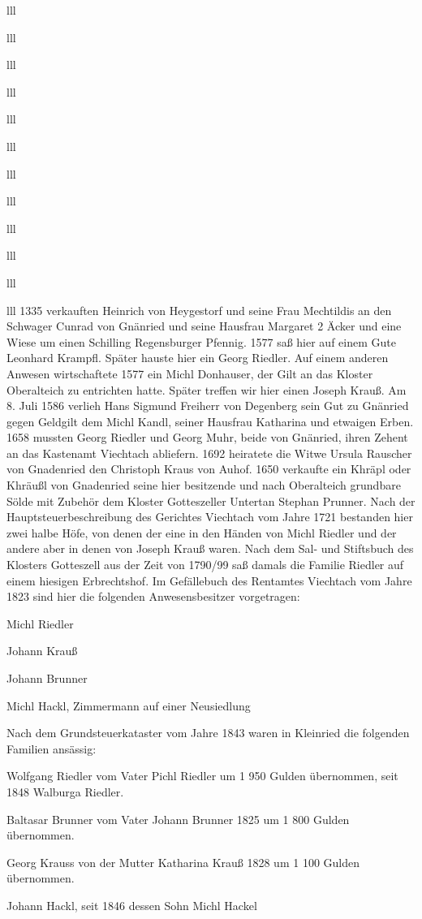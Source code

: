 \documentclass[12pt,a4pager]{book}
\begin{document}
\begin{tabuluar}{lll}
\begin{tabuluar}{lll}
\begin{tabuluar}{lll}
\begin{tabuluar}{lll}
\begin{tabuluar}{lll}
\begin{tabuluar}{lll}
\begin{tabuluar}{lll}
\begin{tabuluar}{lll}
\begin{tabuluar}{lll}
\begin{tabuluar}{lll}
\begin{tabuluar}{lll}
\begin{tabuluar}{lll}
1335 verkauften Heinrich von Heygestorf und seine Frau Mechtildis an den
Schwager Cunrad von Gnänried und seine Hausfrau Margaret 2 Äcker und eine Wiese
um einen Schilling Regensburger Pfennig. 1577 saß hier auf einem Gute Leonhard
Krampfl. Später hauste hier ein Georg Riedler. Auf einem anderen Anwesen
wirtschaftete 1577 ein Michl Donhauser, der Gilt an das Kloster Oberalteich zu
entrichten hatte. Später treffen wir hier einen Joseph Krauß. Am 8. Juli 1586
verlieh Hans Sigmund Freiherr von Degenberg sein Gut zu Gnänried gegen Geldgilt
dem Michl Kandl, seiner Hausfrau Katharina und etwaigen Erben. 1658 mussten
Georg Riedler und Georg Muhr, beide von Gnänried, ihren Zehent an das Kastenamt
Viechtach abliefern. 1692 heiratete die Witwe Ursula Rauscher von Gnadenried den
Christoph Kraus von Auhof. 1650 verkaufte ein Khräpl oder Khräußl von Gnadenried
seine hier besitzende und nach Oberalteich grundbare Sölde mit Zubehör dem
Kloster Gotteszeller Untertan Stephan Prunner. Nach der Hauptsteuerbeschreibung
des Gerichtes Viechtach vom Jahre 1721 bestanden hier zwei halbe Höfe, von denen
der eine in den Händen von Michl Riedler und der andere aber in denen von Joseph
Krauß waren. Nach dem Sal- und Stiftsbuch des Klosters Gotteszell aus der Zeit
von 1790/99 saß damals die Familie Riedler auf einem hiesigen Erbrechtshof. Im
Gefällebuch des Rentamtes Viechtach vom Jahre 1823 sind hier die folgenden
Anwesensbesitzer vorgetragen:

\begin{compactitem}
\item Michl Riedler
\item Johann Krauß
\item Johann Brunner
\item Michl Hackl, Zimmermann auf einer Neusiedlung
\end{compactitem}

Nach dem Grundsteuerkataster vom Jahre 1843 waren in Kleinried die folgenden
Familien ansässig:

\begin{compactitem}
\item Wolfgang Riedler vom Vater Pichl Riedler um 1 950 Gulden übernommen, seit
1848 Walburga Riedler.
\item Baltasar Brunner vom Vater Johann Brunner 1825 um 1 800 Gulden übernommen.
\item Georg Krauss von der Mutter Katharina Krauß 1828 um 1 100 Gulden
übernommen.
\item Johann Hackl, seit 1846 dessen Sohn Michl Hackel
\end{compactitem}


\end{tabuluar}
\end{tabuluar}
\end{tabuluar}
\end{tabuluar}
\end{tabuluar}
\end{tabuluar}
\end{tabuluar}
\end{tabuluar}
\end{tabuluar}
\end{tabuluar}
\end{tabuluar}
\end{tabuluar}
\end{document}

